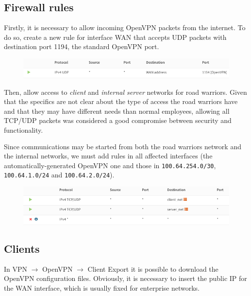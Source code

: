 \documentclass{homework}
\newcommand{\client}{\textit{client}\xspace}
\newcommand{\ser}{\textit{internal server}\xspace}
\begin{document}
    \subsection{Firewall rules}
    Firstly, it is necessary to allow incoming OpenVPN packets from the internet.
    To do so, create a new rule for interface WAN that accepts UDP packets with destination port 1194, the standard OpenVPN port.
    \begin{figure}[H]
        \centering
        \includegraphics[width=\linewidth]{openvpn/rules-vpn}
        \label{fig:openvpn-rules-vpn}
    \end{figure}
    
    Then, allow access to \client and \ser networks for road warriors.
    Given that the specifics are not clear about the type of access the road warriors have and that they may have different needs than normal employees, allowing all TCP/UDP packets was considered a good compromise between security and functionality.
    
    Since communications may be started from both the road warriors network and the internal networks, we must add rules in all affected interfaces (the automatically-generated OpenVPN one and those in \texttt{100.64.254.0/30}, \texttt{100.64.1.0/24} and \texttt{100.64.2.0/24}).
    \begin{figure}[H]
        \centering
        \includegraphics[width=\linewidth]{openvpn/rules-clients}
        \label{fig:rules-clients}
    \end{figure}
       
    \subsection{Clients}
    In VPN $\rightarrow$ OpenVPN $\rightarrow$ Client Export it is possible to download the OpenVPN configuration files.
    Obviously, it is necessary to insert the public IP for the WAN interface, which is usually fixed for enterprise networks.
    
\end{document}
